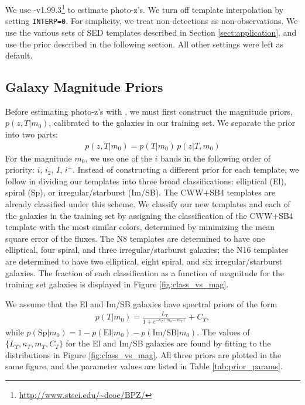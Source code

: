 We use \bpz-v1.99.3\footnote{\url{http://www.stsci.edu/~dcoe/BPZ/}} to estimate photo-z's.
We turn off template interpolation by setting \texttt{INTERP=0}.
For simplicity, we treat non-detections as non-observations.
We use the various sets of SED templates described in Section \ref{sect:application}, and use the prior described in the following section.
All other settings were left as default.

\bigskip
\subsection{Galaxy Magnitude Priors}

Before estimating photo-z's with \bpz, we must first construct the magnitude priors, $p(z,T|m_0)$, calibrated to the galaxies in our training set.
We separate the prior into two parts:
\begin{align}
    p(z,T|m_0) = p(T|m_0) \, p(z|T,m_0)
\end{align}
For the magnitude $m_0$, we use one of the $i$ bands in the following order of priority: $i$, $i_2$, $I$, $i^+$.
Instead of constructing a different prior for each template, we follow \citet{Benitez2000a} in dividing our templates into three broad classifications: elliptical (El), spiral (Sp), or irregular/starburst (Im/SB).
The CWW+SB4 templates are already classified under this scheme.
We classify our new templates and each of the galaxies in the training set by assigning the classification of the CWW+SB4 template with the most similar colors, determined by minimizing the mean square error of the fluxes.
The N8 templates are determined to have one elliptical, four spiral, and three irregular/starburst galaxies; the N16 templates are determined to have two elliptical, eight spiral, and six irregular/starburst galaxies.
The fraction of each classification as a function of magnitude for the training set galaxies is displayed in Figure \ref{fig:class_vs_mag}.

We assume that the El and Im/SB galaxies have spectral priors of the form
\begin{align}
    p(T|m_0) = \frac{L_T}{1+e^{-\kappa_T(m_0 - m_T)}} + C_T,
\end{align}
while $p(\text{Sp}|m_0) = 1 - p(\text{El}|m_0) - p(\text{Im/SB}|m_0)$.
The values of $\{L_T,\kappa_T,m_T,C_T\}$ for the El and Im/SB galaxies are found by fitting to the distributions in Figure \ref{fig:class_vs_mag}.
All three priors are plotted in the same figure, and the parameter values are listed in Table \ref{tab:prior_params}.

